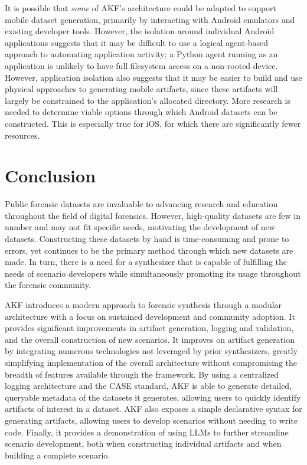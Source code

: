 \documentclass[letterpaper,12pt]{report}
\begin{document}
It is possible that \emph{some} of AKF's architecture could be adapted
to support mobile dataset generation, primarily by interacting with
Android emulators and existing developer tools. However, the isolation
around individual Android applications suggests that it may be difficult
to use a logical agent-based approach to automating application
activity; a Python agent running as an application is unlikely to have
full filesystem access on a non-rooted device. However, application
isolation also suggests that it may be easier to build and use physical
approaches to generating mobile artifacts, since these artifacts will
largely be constrained to the application's allocated directory. More
research is needed to determine viable options through which Android
datasets can be constructed. This is especially true for iOS, for which
there are significantly fewer resources.

\chapter{Conclusion}\label{chapter-nine}

Public forensic datasets are invaluable to advancing research and
education throughout the field of digital forensics. However,
high-quality datasets are few in number and may not fit specific needs,
motivating the development of new datasets. Constructing these datasets
by hand is time-consuming and prone to errors, yet continues to be the
primary method through which new datasets are made. In turn, there is a
need for a synthesizer that is capable of fulfilling the needs of
scenario developers while simultaneously promoting its usage throughout
the forensic community.

AKF introduces a modern approach to forensic synthesis through a modular
architecture with a focus on sustained development and community
adoption. It provides significant improvements in artifact generation,
logging and validation, and the overall construction of new scenarios.
It improves on artifact generation by integrating numerous technologies
not leveraged by prior synthesizers, greatly simplifying implementation
of the overall architecture without compromising the breadth of features
available through the framework. By using a centralized logging
architecture and the CASE standard, AKF is able to generate detailed,
queryable metadata of the datasets it generates, allowing users to
quickly identify artifacts of interest in a dataset. AKF also exposes a
simple declarative syntax for generating artifacts, allowing users to
develop scenarios without needing to write code. Finally, it provides a
demonstration of using LLMs to further streamline scenario development,
both when constructing individual artifacts and when building a complete
scenario.
\end{document}
